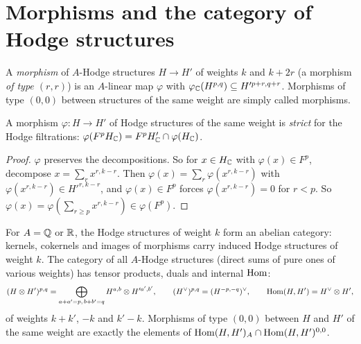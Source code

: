 \section{Morphisms and the category of Hodge structures}\label{hodge-structures:section-category}

\begin{definition}\label{hodge-structures:definition-morphism}
A \emph{morphism} of $A$-Hodge structures $H \to H'$ of weights $k$ and $k + 2r$ (a morphism \emph{of type $(r, r)$}) is an $A$-linear map $\varphi$ with
$\varphi_{\mathbb{C}}(H^{p,q}) \subseteq H'^{p+r,q+r}$. Morphisms of type $(0,0)$ between structures of the same weight are simply called morphisms.
\end{definition}

\begin{proposition}\label{hodge-structures:proposition-strict}
A morphism $\varphi \colon H \to H'$ of Hodge structures of the same weight is \emph{strict} for the Hodge filtrations: $\varphi(F^pH_{\mathbb{C}}) = F^pH'_{\mathbb{C}} \cap \varphi(H_{\mathbb{C}})$.
\end{proposition}

\begin{proof}
$\varphi$ preserves the decompositions. So for $x \in H_{\mathbb{C}}$ with $\varphi(x) \in F^p$, decompose $x = \sum_rx^{r,k-r}$. Then $\varphi(x) = \sum_r\varphi(x^{r,k-r})$ with $\varphi(x^{r,k-r}) \in H'^{r,k-r}$, and
$\varphi(x) \in F^p$ forces $\varphi(x^{r,k-r}) = 0$ for $r < p$. So $\varphi(x) = \varphi(\sum_{r \geq p}x^{r,k-r}) \in \varphi(F^p)$.
\end{proof}

\begin{theorem}\label{hodge-structures:theorem-abelian}
For $A = \mathbb{Q}$ or $\mathbb{R}$, the Hodge structures of weight $k$ form an abelian category: kernels, cokernels and images of morphisms carry induced Hodge structures of weight $k$. The
category of all $A$-Hodge structures (direct sums of pure ones of various weights) has tensor products, duals and internal $\operatorname{Hom}$:
\[
(H \otimes H')^{p,q} = \bigoplus_{a+a'=p,\,b+b'=q}H^{a,b} \otimes H'^{a',b'}, \qquad (H^\vee)^{p,q} = (H^{-p,-q})^\vee, \qquad \operatorname{Hom}(H, H') = H^\vee \otimes H',
\]
of weights $k + k'$, $-k$ and $k' - k$. Morphisms of type $(0,0)$ between $H$ and $H'$ of the same weight are exactly the elements of $\operatorname{Hom}(H, H')_A \cap \operatorname{Hom}(H, H')^{0,0}$.
\end{theorem}

